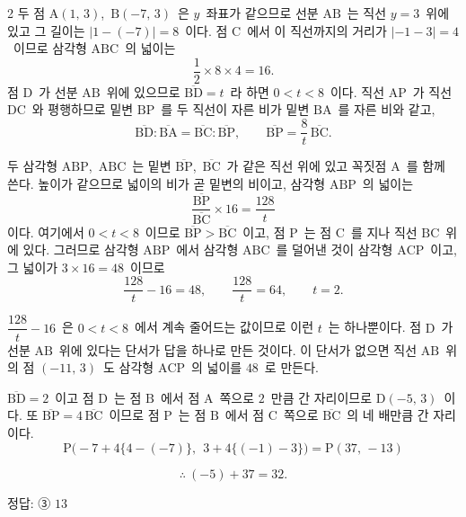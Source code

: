 \documentclass[10pt,fleqn]{article}
\begin{document}
\begin{multicols*}{2}
두 점 $\mathrm{A}(1,\,3)$,\ $\mathrm{B}(-7,\,3)$\ 은 $y$\ 좌표가 같으므로 선분 $\mathrm{AB}$\ 는 직선 $y=3$\ 위에 있고 그 길이는 $|1-(-7)|=8$\ 이다. 점 $\mathrm{C}$\ 에서 이 직선까지의 거리가 $|-1-3|=4$\ 이므로 삼각형 $\mathrm{ABC}$\ 의 넓이는
$$\dfrac12\times 8\times 4=16.$$
점 $\mathrm{D}$\ 가 선분 $\mathrm{AB}$\ 위에 있으므로 $\overline{\mathrm{BD}}=t$\ 라 하면 $0<t<8$\ 이다. 직선 $\mathrm{AP}$\ 가 직선 $\mathrm{DC}$\ 와 평행하므로 밑변 $\mathrm{BP}$\ 를 두 직선이 자른 비가 밑변 $\mathrm{BA}$\ 를 자른 비와 같고,
$$\overline{\mathrm{BD}}:\overline{\mathrm{BA}}=\overline{\mathrm{BC}}:\overline{\mathrm{BP}},\qquad \overline{\mathrm{BP}}=\dfrac{8}{t}\,\overline{\mathrm{BC}}.$$

두 삼각형 $\mathrm{ABP}$,\ $\mathrm{ABC}$\ 는 밑변 $\overline{\mathrm{BP}}$,\ $\overline{\mathrm{BC}}$\ 가 같은 직선 위에 있고 꼭짓점 $\mathrm{A}$\ 를 함께 쓴다. 높이가 같으므로 넓이의 비가 곧 밑변의 비이고, 삼각형 $\mathrm{ABP}$\ 의 넓이는
$$\dfrac{\overline{\mathrm{BP}}}{\overline{\mathrm{BC}}}\times 16=\dfrac{128}{t}$$
이다. 여기에서 $0<t<8$\ 이므로 $\overline{\mathrm{BP}}>\overline{\mathrm{BC}}$\ 이고, 점 $\mathrm{P}$\ 는 점 $\mathrm{C}$\ 를 지나 직선 $\mathrm{BC}$\ 위에 있다. 그러므로 삼각형 $\mathrm{ABP}$\ 에서 삼각형 $\mathrm{ABC}$\ 를 덜어낸 것이 삼각형 $\mathrm{ACP}$\ 이고, 그 넓이가 $3\times 16=48$\ 이므로
$$\dfrac{128}{t}-16=48,\qquad \dfrac{128}{t}=64,\qquad t=2.$$

$\dfrac{128}{t}-16$\ 은 $0<t<8$\ 에서 계속 줄어드는 값이므로 이런 $t$\ 는 하나뿐이다. 점 $\mathrm{D}$\ 가 선분 $\mathrm{AB}$\ 위에 있다는 단서가 답을 하나로 만든 것이다. 이 단서가 없으면 직선 $\mathrm{AB}$\ 위의 점 $(-11,\,3)$\ 도 삼각형 $\mathrm{ACP}$\ 의 넓이를 $48$\ 로 만든다.

$\overline{\mathrm{BD}}=2$\ 이고 점 $\mathrm{D}$\ 는 점 $\mathrm{B}$\ 에서 점 $\mathrm{A}$\ 쪽으로 $2$\ 만큼 간 자리이므로 $\mathrm{D}(-5,\,3)$\ 이다. 또 $\overline{\mathrm{BP}}=4\,\overline{\mathrm{BC}}$\ 이므로 점 $\mathrm{P}$\ 는 점 $\mathrm{B}$\ 에서 점 $\mathrm{C}$\ 쪽으로 $\overline{\mathrm{BC}}$\ 의 네 배만큼 간 자리이다.
$$\mathrm{P}\big(-7+4\{4-(-7)\},\ \ 3+4\{(-1)-3\}\big)=\mathrm{P}(37,\,-13)$$

$$\therefore\ (-5)+37=32.$$


\begin{dmanswerbox}
정답: ③ $13$
\end{dmanswerbox}


\end{multicols*}
\end{document}
